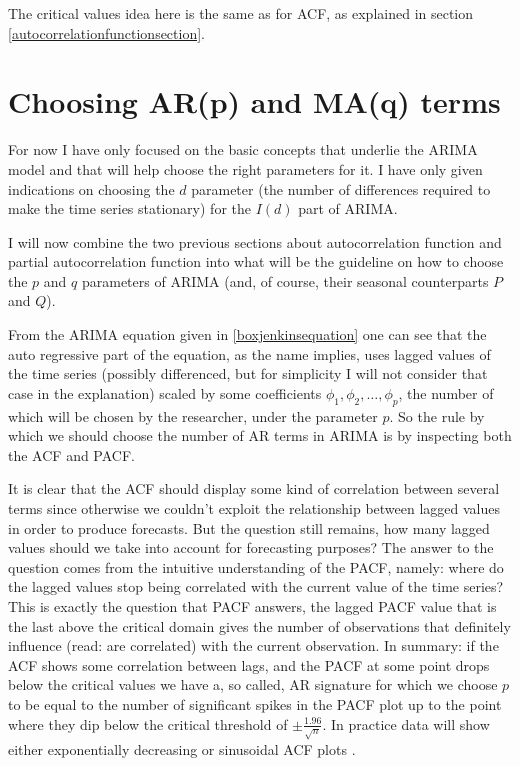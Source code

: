 \documentclass[12pt,a4paper,titlepage]{report}
\begin{document}
The critical values idea here is the same as for ACF, as explained in section \ref{autocorrelationfunctionsection}.

\section{Choosing AR(p) and MA(q) terms} \label{choosingarandmasection}

For now I have only focused on the basic concepts that underlie the ARIMA model and that will help choose the right parameters for it.  I have only given indications on choosing the $ d $ parameter (the number of differences required to make the time series stationary) for the $ I(d) $ part of ARIMA.

I will now combine the two previous sections about autocorrelation function and partial autocorrelation function into what will be the guideline on how to choose the $ p $ and $ q $ parameters of ARIMA (and, of course, their seasonal counterparts $ P $ and $ Q $).

From the ARIMA equation given in \ref{boxjenkinsequation}  one can see that the auto regressive part of the equation, as the name implies, uses lagged values of the time series (possibly differenced, but for simplicity I will not consider that case in the explanation) scaled by some coefficients $ \phi_{1}, \phi_{2}, \dots, \phi_{p} $, the number of which will be chosen by the researcher, under the parameter $ p $. So the rule by which we should choose the number of AR terms in ARIMA is by inspecting both the ACF and PACF. 

It is clear that the ACF should display some kind of correlation between several terms since otherwise we couldn't exploit the relationship between lagged values in order to produce forecasts. But the question still remains, how many lagged values should we take into account for forecasting purposes? The answer to the question comes from the intuitive understanding of the PACF, namely: where do the lagged values stop being correlated with the current value of the time series? This is exactly the question that PACF answers, the lagged PACF value that is the last above the critical domain gives the number of observations that definitely influence (read: are correlated) with the current observation. In summary: if the ACF shows some correlation between lags, and the PACF at some point drops below the critical values we have a, so called, AR signature for which we choose $ p $ to be equal to the number of significant spikes in the PACF plot up to the point where they dip below the critical threshold of $ \pm \frac{1.96}{\sqrt{n}} $. In practice data will show either exponentially decreasing or sinusoidal ACF plots \cite{fpp2nonseasonalarima}.
\end{document}
